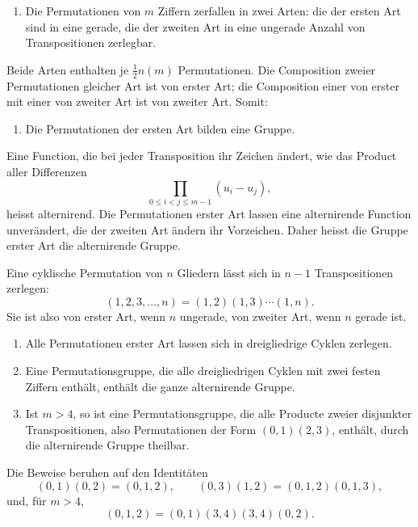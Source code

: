 \documentclass[11pt]{article}
\begin{document}
\begin{enumerate}[label=\arabic*.,leftmargin=2em,start=4]
\item Die Permutationen von $m$ Ziffern zerfallen in zwei Arten: die der ersten Art sind in eine gerade, die der zweiten Art in eine ungerade Anzahl von Transpositionen zerlegbar.
\end{enumerate}

Beide Arten enthalten je $\frac12 n(m)$ Permutationen. Die Composition zweier Permutationen gleicher Art ist von erster Art; die Composition einer von erster mit einer von zweiter Art ist von zweiter Art. Somit:
\begin{enumerate}[label=\arabic*.,leftmargin=2em,start=5]
\item Die Permutationen der ersten Art bilden eine Gruppe.
\end{enumerate}

Eine Function, die bei jeder Transposition ihr Zeichen ändert, wie das Product aller Differenzen
\[
        \prod_{0\le i<j\le m-1}(u_i-u_j),
\]
heisst alternirend. Die Permutationen erster Art lassen eine alternirende Function unverändert, die der zweiten Art ändern ihr Vorzeichen. Daher heisst die Gruppe erster Art die alternirende Gruppe.

Eine cyklische Permutation von $n$ Gliedern lässt sich in $n-1$ Transpositionen zerlegen:
\[
        (1,2,3,
\ldots,n)=(1,2)(1,3)\cdots(1,n).
\]
Sie ist also von erster Art, wenn $n$ ungerade, von zweiter Art, wenn $n$ gerade ist.

\begin{enumerate}[label=\arabic*.,leftmargin=2em,start=6]
\item Alle Permutationen erster Art lassen sich in dreigliedrige Cyklen zerlegen.
\item Eine Permutationsgruppe, die alle dreigliedrigen Cyklen mit zwei festen Ziffern enthält, enthält die ganze alternirende Gruppe.
\item Ist $m>4$, so ist eine Permutationsgruppe, die alle Producte zweier disjunkter Transpositionen, also Permutationen der Form $(0,1)(2,3)$, enthält, durch die alternirende Gruppe theilbar.
\end{enumerate}

Die Beweise beruhen auf den Identitäten
\[
        (0,1)(0,2)=(0,1,2),
        \qquad
        (0,3)(1,2)=(0,1,2)(0,1,3),
\]
und, für $m>4$,
\[
        (0,1,2)=(0,1)(3,4)(3,4)(0,2).
\]
\end{document}
